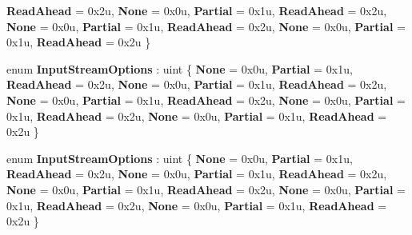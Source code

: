 \begin{DoxyCompactItemize}
{\bfseries Read\+Ahead} = 0x2u, 
{\bfseries None} = 0x0u, 
{\bfseries Partial} = 0x1u, 
\newline
{\bfseries Read\+Ahead} = 0x2u, 
{\bfseries None} = 0x0u, 
{\bfseries Partial} = 0x1u, 
{\bfseries Read\+Ahead} = 0x2u, 
\newline
{\bfseries None} = 0x0u, 
{\bfseries Partial} = 0x1u, 
{\bfseries Read\+Ahead} = 0x2u
 \}
\item 
\mbox{\label{namespace_windows_1_1_storage_1_1_streams_a3d6f4be12cc7f53f38e7eca63196783c}} 
enum {\bfseries Input\+Stream\+Options} \+: uint \{ \newline
{\bfseries None} = 0x0u, 
{\bfseries Partial} = 0x1u, 
{\bfseries Read\+Ahead} = 0x2u, 
{\bfseries None} = 0x0u, 
\newline
{\bfseries Partial} = 0x1u, 
{\bfseries Read\+Ahead} = 0x2u, 
{\bfseries None} = 0x0u, 
{\bfseries Partial} = 0x1u, 
\newline
{\bfseries Read\+Ahead} = 0x2u, 
{\bfseries None} = 0x0u, 
{\bfseries Partial} = 0x1u, 
{\bfseries Read\+Ahead} = 0x2u, 
\newline
{\bfseries None} = 0x0u, 
{\bfseries Partial} = 0x1u, 
{\bfseries Read\+Ahead} = 0x2u
 \}
\item 
\mbox{\label{namespace_windows_1_1_storage_1_1_streams_a3d6f4be12cc7f53f38e7eca63196783c}} 
enum {\bfseries Input\+Stream\+Options} \+: uint \{ \newline
{\bfseries None} = 0x0u, 
{\bfseries Partial} = 0x1u, 
{\bfseries Read\+Ahead} = 0x2u, 
{\bfseries None} = 0x0u, 
\newline
{\bfseries Partial} = 0x1u, 
{\bfseries Read\+Ahead} = 0x2u, 
{\bfseries None} = 0x0u, 
{\bfseries Partial} = 0x1u, 
\newline
{\bfseries Read\+Ahead} = 0x2u, 
{\bfseries None} = 0x0u, 
{\bfseries Partial} = 0x1u, 
{\bfseries Read\+Ahead} = 0x2u, 
\newline
{\bfseries None} = 0x0u, 
{\bfseries Partial} = 0x1u, 
{\bfseries Read\+Ahead} = 0x2u
 \}
\end{DoxyCompactItemize}
